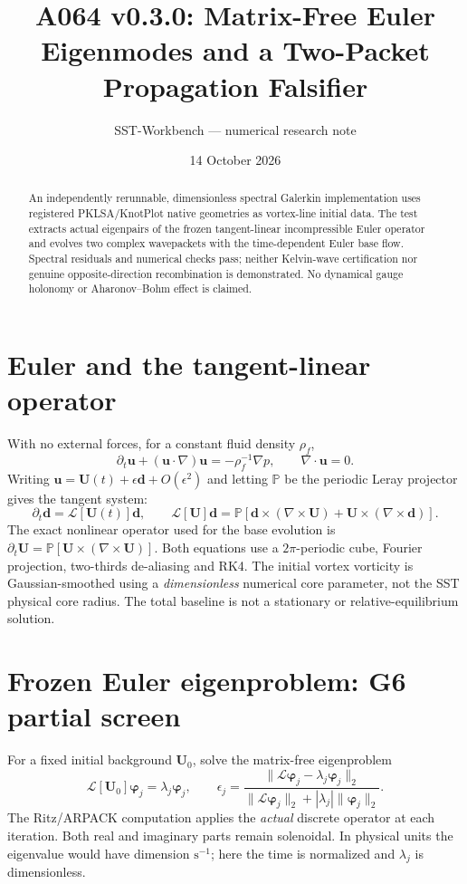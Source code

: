 \documentclass[11pt,a4paper]{article}
\title{A064 v0.3.0: Matrix-Free Euler Eigenmodes and a Two-Packet Propagation Falsifier}
\author{SST-Workbench --- numerical research note}
\date{14 October 2026}
\begin{document}
\maketitle
\begin{abstract}
An independently rerunnable, dimensionless spectral Galerkin implementation uses registered PKLSA/KnotPlot native geometries as vortex-line initial data. The test extracts actual eigenpairs of the frozen tangent-linear incompressible Euler operator and evolves two complex wavepackets with the time-dependent Euler base flow. Spectral residuals and numerical checks pass; neither Kelvin-wave certification nor genuine opposite-direction recombination is demonstrated. No dynamical gauge holonomy or Aharonov--Bohm effect is claimed.
\end{abstract}
\section{Euler and the tangent-linear operator}
With no external forces, for a constant fluid density $\rho_{\!f}$,
\begin{equation}
\partial_t\mathbf u +(\mathbf u\cdot\nabla)\mathbf u=-\rho_{\!f}^{-1}\nabla p, \qquad \nabla\cdot\mathbf u=0.
\end{equation}
Writing $\mathbf u=\mathbf U(t)+\epsilon\mathbf d+O(\epsilon^2)$ and letting $\mathbb P$ be the periodic Leray projector gives the tangent system:
\begin{equation}\label{eq:tangent}
\partial_t\mathbf d=\mathcal L[\mathbf U(t)]\mathbf d,
\qquad \mathcal L[\mathbf U]\mathbf d=\mathbb P\left[\mathbf d\times(\nabla\times\mathbf U)+\mathbf U\times(\nabla\times\mathbf d)\right].
\end{equation}
The exact nonlinear operator used for the base evolution is $\partial_t\mathbf U=\mathbb P[\mathbf U\times(\nabla\times\mathbf U)]$. Both equations use a $2\pi$-periodic cube, Fourier projection, two-thirds de-aliasing and RK4. The initial vortex vorticity is Gaussian-smoothed using a \emph{dimensionless} numerical core parameter, not the SST physical core radius. The total baseline is not a stationary or relative-equilibrium solution.
\section{Frozen Euler eigenproblem: G6 partial screen}
For a fixed initial background $\mathbf U_0$, solve the matrix-free eigenproblem
\begin{equation}
\mathcal L[\mathbf U_0]\boldsymbol\varphi_j=\lambda_j\boldsymbol\varphi_j,\qquad
\epsilon_j=\frac{\|\mathcal L\boldsymbol\varphi_j-\lambda_j\boldsymbol\varphi_j\|_2}{\|\mathcal L\boldsymbol\varphi_j\|_2+|\lambda_j|\|\boldsymbol\varphi_j\|_2}.
\end{equation}
The Ritz/ARPACK computation applies the \emph{actual} discrete operator at each iteration. Both real and imaginary parts remain solenoidal. In physical units the eigenvalue would have dimension $\mathrm{s}^{-1}$; here the time is normalized and $\lambda_j$ is dimensionless.
\end{document}
